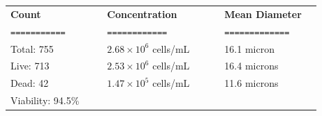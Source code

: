 \documentclass[UTF8,10pt,a4paper,fontset=fandol]{ctexart}
\newcommand{\fieldvalue}[1]{#1}
\begin{document}
\medskip
\begin{tabular}{@{}p{0.28\linewidth}p{0.34\linewidth}p{0.28\linewidth}@{}}
\textbf{Count} & \textbf{Concentration} & \textbf{Mean Diameter} \\
\texttt{===========} & \texttt{============} & \texttt{=============} \\

Total:
\fieldvalue{755}
&
\fieldvalue{$2.68\times10^{6}$ cells/mL}
&
\fieldvalue{16.1 micron}
\\

Live:
\fieldvalue{713}
&
\fieldvalue{$2.53\times10^{6}$ cells/mL}
&
\fieldvalue{16.4 microns}
\\

Dead:
\fieldvalue{42}
&
\fieldvalue{$1.47\times10^{5}$ cells/mL}
&
\fieldvalue{11.6 microns}
\\

Viability:
\fieldvalue{94.5\%}
&
&
\end{tabular}

\medskip

\noindent
\begin{minipage}[t]{0.48\linewidth}
\centering
{}
\end{minipage}
\hfill
\begin{minipage}[t]{0.48\linewidth}
\centering
{}
\end{minipage}

\medskip

\noindent
\begin{minipage}[t]{0.48\linewidth}
\centering
{}
\end{minipage}
\hfill
\begin{minipage}[t]{0.48\linewidth}
\centering
{}
\end{minipage}
\end{document}
